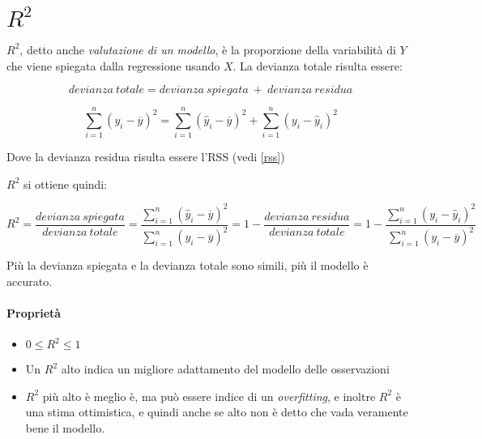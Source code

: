 \section{$R^2$}

$R^2$, detto anche \textit{valutazione di un modello}, \`e la proporzione della 
variabilit\`a di $Y$ che viene spiegata dalla regressione usando $X$.
La devianza totale risulta essere:

\[ devianza\ totale = devianza\ spiegata\ +\ devianza\ residua\]

\[ \sum_{i=1}^n (y_i - \overline{y})^2 = \sum_{i=1}^n (\hat{y}_i - 
\overline{y})^2 + \sum_{i=1}^n (y_i - \hat{y}_i)^2 \]

Dove la devianza residua risulta essere l'RSS (vedi \ref{rss})

$R^2$ si ottiene quindi:

\[ R^2 = \frac{devianza\ spiegata}{devianza\ totale} = \frac{\sum_{i=1}^n 
(\hat{y}_i - \overline{y})^2}{\sum_{i=1}^n (y_i - \overline{y})^2} = 1 - 
\frac{devianza\ residua}{devianza\ totale} = 1 - \frac{\sum_{i=1}^n (y_i - 
\hat{y}_i)^2}{\sum_{i=1}^n (y_i - \overline{y})^2} \]

Più la devianza spiegata e la devianza totale sono simili, più il modello è
accurato.

\paragraph*{Propriet\`a}
\begin{itemize}
 \item $0 \le R^2 \le 1$
 \item Un $R^2$ alto indica un migliore adattamento del modello delle 
osservazioni
 \item $R^2$ pi\`u alto \`e meglio \`e, ma pu\`o essere indice di un
\textit{overfitting}, e inoltre $R^2$ \`e una stima ottimistica, e quindi anche 
se alto non \`e detto che vada veramente bene il modello.
\end{itemize}
